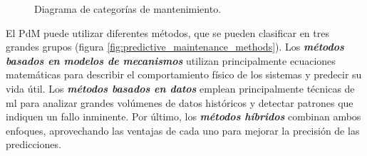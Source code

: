 \documentclass[IB]{TFUOC}
\begin{document}
\begin{figure}[H]

  \shorthandon{>}

  \caption{Diagrama de categorías de mantenimiento.}
  \label{fig:maintenance_categories}
\end{figure}

El \gls{PdM} puede utilizar diferentes métodos, que se pueden clasificar en tres grandes grupos (figura
\ref{fig:predictive_maintenance_methods}). Los \textit{\textbf{métodos basados en modelos de mecanismos}} utilizan
principalmente ecuaciones matemáticas para describir el comportamiento físico de los sistemas y predecir su vida útil.
Los \textit{\textbf{métodos basados en datos}} emplean principalmente técnicas de \gls{ml} para analizar grandes
volúmenes de datos históricos y detectar patrones que indiquen un fallo inminente. Por último, los
\textit{\textbf{métodos híbridos}} combinan ambos enfoques, aprovechando las ventajas de cada uno para mejorar la
precisión de las predicciones.
\end{document}

